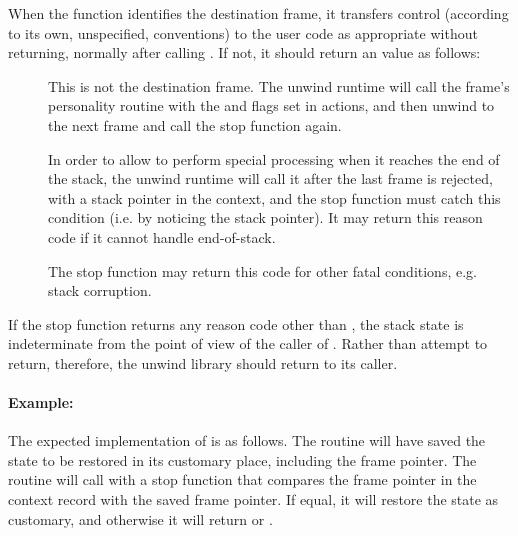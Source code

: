 When the  function identifies the destination frame, it
transfers control (according to its own, unspecified, conventions)
to the user code as appropriate without returning, normally after
calling . If not, it should return an
 value as follows:

\begin{description}
\item[]
     This is not the destination frame. The unwind
     runtime will call the frame's personality routine with the
      and  flags set in actions,
     and then unwind to the next frame and call the stop function again.

\item[] In order to allow 
     to perform special processing when it reaches the end of the stack,
     the unwind runtime will call it after the last frame is rejected,
     with a  stack pointer in the context, and the stop function must
     catch this condition (i.e. by noticing the  stack pointer).
     It may return this reason code if it cannot handle end-of-stack.

\item[] The stop function may return this code
     for other fatal conditions, e.g. stack corruption.
\end{description}

If the stop function returns any reason code other than ,
the stack state is indeterminate from the point of view of the caller of
. Rather than attempt to return, therefore,
the unwind library should return  to its caller.

\paragraph{Example: \\}

The expected implementation of  is as follows.
The  routine will have saved the state to be restored in its
customary place, including the frame pointer. The 
routine will call  with a stop function that
compares the frame pointer in the context record with the saved frame
pointer. If equal, it will restore the  state as customary,
and otherwise it will return  or .

